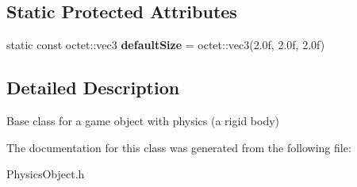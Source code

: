 \subsection*{Static Protected Attributes}
\begin{DoxyCompactItemize}
\item 
\hypertarget{class_arena_1_1_physics_object_a0b1e6536e2d403aff86c54c546772099}{static const octet\+::vec3 {\bfseries default\+Size} = octet\+::vec3(2.\+0f, 2.\+0f, 2.\+0f)}\label{class_arena_1_1_physics_object_a0b1e6536e2d403aff86c54c546772099}

\end{DoxyCompactItemize}


\subsection{Detailed Description}
Base class for a game object with physics (a rigid body) 

The documentation for this class was generated from the following file\+:\begin{DoxyCompactItemize}
\item 
Physics\+Object.\+h\end{DoxyCompactItemize}
